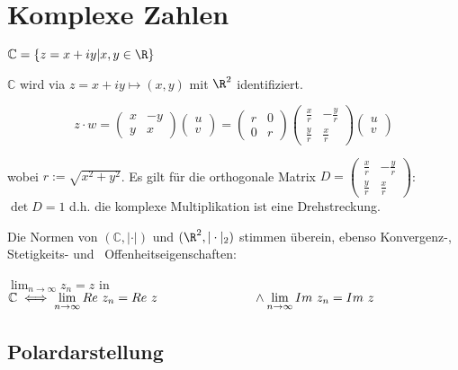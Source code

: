 \newcommand{\C}{\mathbb{C}}

\section*{Komplexe Zahlen}

$\C = \{ z = x+iy | x,y \in \R \}$

$\C$ wird via $z = x + iy \mapsto (x,y)$ mit $\R^2$ identifiziert.

\vspace*{-4mm}
$$z \cdot w = \begin{pmatrix} x & -y \\ y & x\end{pmatrix} \begin{pmatrix} u \\ v\end{pmatrix} = \begin{pmatrix} r & 0 \\ 0 & r\end{pmatrix} \begin{pmatrix} \frac{x}{r} & -\frac{y}{r} \\ \frac{y}{r} & \frac{x}{r}\end{pmatrix} \begin{pmatrix} u \\ v\end{pmatrix}$$

wobei $r := \sqrt{x^2 + y^2}$. Es gilt für die orthogonale Matrix $D = \begin{pmatrix} \frac{x}{r} & -\frac{y}{r} \\ \frac{y}{r} & \frac{x}{r}\end{pmatrix}$: $\det D = 1$ d.h. die komplexe Multiplikation ist eine Drehstreckung.

\vspace*{1mm}

Die Normen von $(\C,|\cdot|)$ und $(\R^2,|\cdot|_2)$ stimmen überein, ebenso Konvergenz-, Stetigkeits- und \ Offenheitseigenschaften:

\spacing
$\displaystyle\lim_{n \to \infty} z_n = z$ in $\C \iff \displaystyle\lim_{n \to \infty} Re \ z_n = Re \ z \\ \hspace*{26.8mm} \land \lim_{n \to \infty} Im \ z_n = Im \ z$

\subsection*{Polardarstellung}

